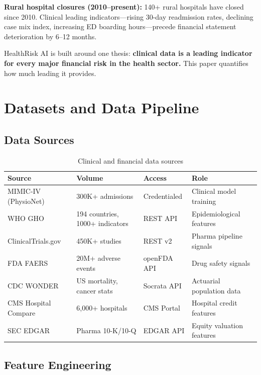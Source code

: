 \documentclass[12pt,a4paper]{article}
\begin{document}
\textbf{Rural hospital closures (2010--present):} 140+ rural hospitals have
closed since 2010. Clinical leading indicators---rising 30-day readmission rates,
declining case mix index, increasing ED boarding hours---precede financial
statement deterioration by 6--12 months.

HealthRisk AI is built around one thesis: \textbf{clinical data is a leading
indicator for every major financial risk in the health sector.} This paper
quantifies how much leading it provides.

\section{Datasets and Data Pipeline}

\subsection{Data Sources}

\begin{table}[H]
\centering
\caption{Clinical and financial data sources}
\begin{tabularx}{\linewidth}{lXll}
\toprule
\textbf{Source} & \textbf{Volume} & \textbf{Access} & \textbf{Role} \\
\midrule
MIMIC-IV (PhysioNet) & 300K+ admissions & Credentialed & Clinical model training \\
WHO GHO & 194 countries, 1000+ indicators & REST API & Epidemiological features \\
ClinicalTrials.gov & 450K+ studies & REST v2 & Pharma pipeline signals \\
FDA FAERS & 20M+ adverse events & openFDA API & Drug safety signals \\
CDC WONDER & US mortality, cancer stats & Socrata API & Actuarial population data \\
CMS Hospital Compare & 6,000+ hospitals & CMS Portal & Hospital credit features \\
SEC EDGAR & Pharma 10-K/10-Q & EDGAR API & Equity valuation features \\
\bottomrule
\end{tabularx}
\end{table}

\subsection{Feature Engineering}
\end{document}
